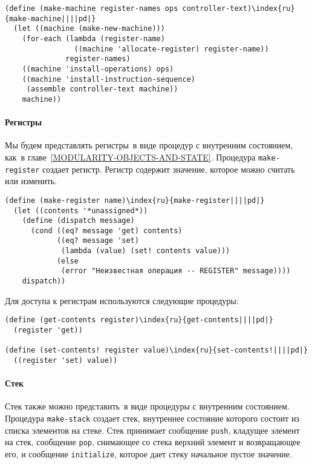 \begin{Verbatim}[fontsize=\small]
(define (make-machine register-names ops controller-text)\index{ru}{make-machine||||pd|}
  (let ((machine (make-new-machine)))
    (for-each (lambda (register-name)
                ((machine 'allocate-register) register-name))
              register-names)
    ((machine 'install-operations) ops)    
    ((machine 'install-instruction-sequence)
     (assemble controller-text machine))
    machine))
\end{Verbatim}

\paragraph{Регистры}


Мы будем представлять регистры~в виде процедур с
внутренним состоянием, как~в 
главе~\ref{MODULARITY-OBJECTS-AND-STATE}.  Процедура
{\tt make-register} создает регистр.  Регистр содержит
значение, которое можно считать или изменить.

\begin{Verbatim}[fontsize=\small]
(define (make-register name)\index{ru}{make-register||||pd|}
  (let ((contents '*unassigned*))
    (define (dispatch message)
      (cond ((eq? message 'get) contents)
            ((eq? message 'set)
             (lambda (value) (set! contents value)))
            (else
             (error "Неизвестная операция -- REGISTER" message))))
    dispatch))
\end{Verbatim}
Для доступа к регистрам используются следующие процедуры:

\begin{Verbatim}[fontsize=\small]
(define (get-contents register)\index{ru}{get-contents||||pd|}
  (register 'get))

(define (set-contents! register value)\index{ru}{set-contents!||||pd|}
  ((register 'set) value))
\end{Verbatim}

\paragraph{Стек}


Стек также можно представить~в виде процедуры с
внутренним состоянием.  Процедура {\tt make-stack} создает
стек, внутреннее состояние которого состоит из списка элементов на
стеке.  Стек принимает сообщение {\tt push}, кладущее
элемент на стек, сообщение {\tt pop}, снимающее со стека
верхний элемент и возвращающее его, и сообщение {\tt initialize},
которое дает стеку начальное пустое значение.

